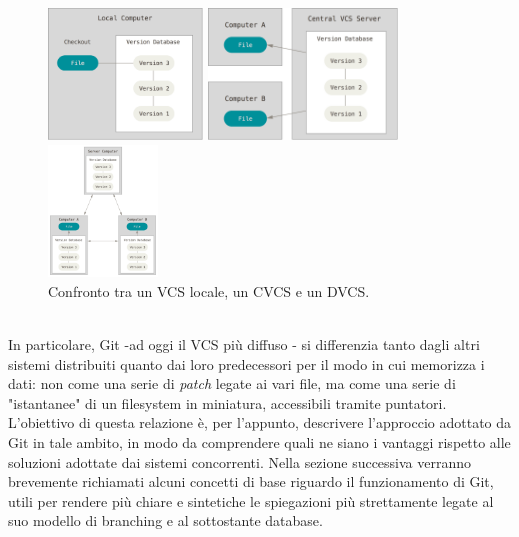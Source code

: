 \documentclass[12pt]{article}
\begin{document}
\begin{figure}[h]
	\centering
		\begin{minipage}{4cm}
			\includegraphics[height=3.5cm]{local.png}
		\end{minipage}
		\qquad
		\begin{minipage}{4cm}
			 \includegraphics[height=3.5cm]{centralized.png}
		\end{minipage}
		\qquad
		\qquad
		\begin{minipage}{4cm}
			\includegraphics[height=3.5cm]{distributed.png}
		\end{minipage}
	\caption{Confronto tra un VCS locale, un CVCS e un DVCS.}
\end{figure}
\\In particolare, Git -ad oggi il VCS più diffuso \cite{openhub}- si differenzia tanto dagli altri sistemi distribuiti quanto dai loro predecessori per il modo in cui memorizza i dati: non come una serie di \textit{patch} legate ai vari file, ma come una serie di "istantanee" di un filesystem in miniatura, accessibili tramite puntatori.
L'obiettivo di questa relazione è, per l'appunto, descrivere l'approccio adottato da Git in tale ambito, in modo da comprendere quali ne siano i vantaggi rispetto alle soluzioni adottate dai sistemi concorrenti.
Nella sezione successiva verranno brevemente richiamati alcuni concetti di base riguardo il funzionamento di Git, utili per rendere più chiare e sintetiche le spiegazioni più strettamente legate al suo modello di branching e al sottostante database.  
\end{document}
